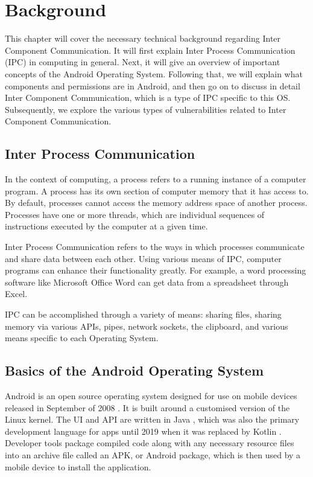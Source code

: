 \chapter{Background}
    \label{chap:conclusion}

   This chapter will cover the necessary technical background regarding Inter Component Communication. It will first explain Inter Process Communication (IPC) in computing in general. Next, it will give an overview of important concepts of the Android Operating System. Following that, we will explain what components and permissions are in Android, and then go on to discuss in detail Inter Component Communication, which is a type of IPC specific to this OS. Subsequently, we explore the various types of vulnerabilities related to Inter Component Communication. 

    \section{Inter Process Communication} 
        \label{sec:ipc}

    In the context of computing, a process refers to a running instance of a computer program. A process has its own section of computer memory that it has access to. By default, processes cannot access the memory address space of another process. Processes have one or more threads, which are individual sequences of instructions executed by the computer at a given time. 
    
    Inter Process Communication refers to the ways in which processes communicate and share data between each other. Using various means of IPC, computer programs can enhance their functionality greatly. For example, a word processing software like Microsoft Office Word can get data from a spreadsheet through Excel.
    
    IPC can be accomplished through a variety of means: sharing files, sharing memory via various APIs, pipes, network sockets, the clipboard, and various means specific to each Operating System.
    
    \section{Basics of the Android Operating System}
        \label{sec:android_basics}
        
    Android is an open source operating system designed for use on mobile devices released in September of 2008 \cite{android_release_date}. It is built around a customised version of the Linux kernel. The UI and API are written in Java \cite{android_languages_statistic}, which was also the primary development language for apps until 2019 when it was replaced by Kotlin \cite{android_using_kotlin}. Developer tools package compiled code along with any necessary resource files into an archive file called an APK, or Android package, which is then used by a mobile device to install the application.
    
